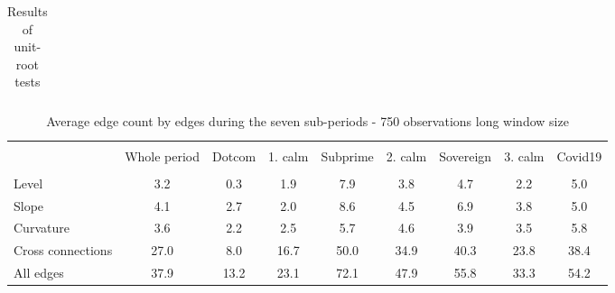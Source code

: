\documentclass[12pt,bibliography=totoc]{article}
\begin{document}
\begin{appendices}
\begin{table}[H]
\begin{subtable}[t]{1\textwidth}
\begin{tabular}{l cc cc cc cc cc cc}
\hline
\end{tabular}
\caption{\textbf{KPSS(1) test results}}
\end{subtable}
\hspace{\fill}
\caption{Results of unit-root tests}
\label{tab:unitRootTest}
\end{table}



\begin{table}[H]
\fontsize{10}{10}\selectfont
\centering%
\begin{tabular}{l  cccccccc}%
\hline\hline \\ [-1.5ex]                         %


				& Whole period  &Dotcom	&1. calm  & Subprime & 2. calm &Sovereign & 3. calm & Covid19 \\
\hline \\ [-1.5ex]  
Level	&	3.2	&	0.3	&	1.9	&	7.9	&	3.8	&	4.7	&	2.2	&	5.0	\\
Slope	&	4.1	&	2.7	&	2.0	&	8.6	&	4.5	&	6.9	&	3.8	&	5.0	\\
Curvature	&	3.6	&	2.2	&	2.5	&	5.7	&	4.6	&	3.9	&	3.5	&	5.8	\\
Cross connections	&	27.0	&	8.0	&	16.7	&	50.0	&	34.9	&	40.3	&	23.8	&	38.4	\\
All edges	&	37.9	&	13.2	&	23.1	&	72.1	&	47.9	&	55.8	&	33.3	&	54.2	\\



\hline            
\end{tabular}
\caption{Average edge count by edges during the seven sub-periods - 750 observations long window size} %
\label{tab:euroEdges}
\end{table}











\addtolength{\tabcolsep}{-1pt}   
\begin{table}[H]


\end{table}
\end{appendices}
\end{document}
